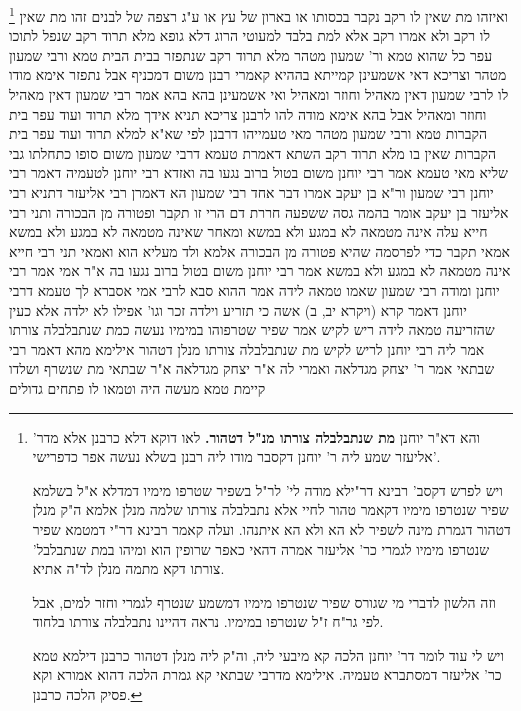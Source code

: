 \documentclass[12pt, openany]{book}
\newcommand{\footnotecomment}[1]{
	\renewcommand\thefootnote{}
	\footnote{#1}}
\newcommand{\commenta}[1]{\footnotecomment{#1}}
\begin{document}
{\commenta{ והא דא"ר יוחנן \textbf{מת שנתבלבלה צורתו מנ"ל דטהור.} לאו דוקא דלא כרבנן אלא מדר' אליעזר שמע ליה ר' יוחנן דקסבר מודו ליה רבנן בשלא נעשה אפר כדפרישי'.\par ויש לפרש דקסב' רבינא דר"ילא מודה לי' לר"ל בשפיר שטרפו מימיו דמדלא א"ל בשלמא שפיר שנטרפו מימיו דקאמר טהור לחיי אלא נתבלבלה צורתו שלמה מנלן אלמא ה"ק מנלן דטהור דגמרת מינה לשפיר לא הא ולא הא איתנהו. ועלה קאמר רבינא דר"י דמטמא שפיר שנטרפו מימיו לגמרי כר' אליעזר אמרה דהאי כאפר שרופין הוא ומיהו במת שנתבלבל' צורתו דקא מתמה מנלן לד"ה אתיא.\par וזה הלשון לדברי מי שגורס שפיר שנטרפו מימיו דמשמע שנטרף לגמרי וחזר למים, אבל לפי גר"ח ז"ל שנטרפו במימיו. נראה דהיינו נתבלבלה צורתו בלחוד.\par ויש לי עוד לומר דר' יוחנן הלכה קא מיבעי ליה, וה"ק ליה מנלן דטהור כרבנן דילמא טמא כר' אליעזר דמסתברא טעמיה. אילימא מדרבי שבתאי קא גמרת הלכה דהוא אמורא וקא פסיק הלכה כרבנן. }
ואיזהו מת שאין לו רקב נקבר בכסותו או בארון של עץ או ע"ג רצפה של לבנים זהו מת שאין לו רקב ולא אמרו רקב אלא למת בלבד למעוטי הרוג דלא 
גופא מלא תרוד רקב שנפל לתוכו עפר כל שהוא טמא ור' שמעון מטהר מלא תרוד רקב שנתפזר בבית הבית טמא ורבי שמעון מטהר 
וצריכא דאי אשמעינן קמייתא בההיא קאמרי רבנן משום דמכניף אבל נתפזר אימא מודו לו לרבי שמעון דאין מאהיל וחוזר ומאהיל 
ואי אשמעינן בהא בהא אמר רבי שמעון דאין מאהיל וחוזר ומאהיל אבל בהא אימא מודה להו לרבנן צריכא 
תניא אידך מלא תרוד ועוד עפר בית הקברות טמא ורבי שמעון מטהר מאי טעמייהו דרבנן לפי שא"א למלא תרוד ועוד עפר בית הקברות שאין בו מלא תרוד רקב 
השתא דאמרת טעמא דרבי שמעון משום סופו כתחלתו גבי שליא מאי טעמא אמר רבי יוחנן משום בטול ברוב נגעו בה 
ואזדא רבי יוחנן לטעמיה דאמר רבי יוחנן רבי שמעון ור"א בן יעקב אמרו דבר אחד רבי שמעון הא דאמרן רבי אליעזר דתניא רבי אליעזר בן יעקב אומר בהמה גסה ששפעה חררת דם הרי זו תקבר ופטורה מן הבכורה 
ותני רבי חייא עלה אינה מטמאה לא במגע ולא במשא ומאחר שאינה מטמאה לא במגע ולא במשא אמאי תקבר כדי לפרסמה שהיא פטורה מן הבכורה 
אלמא ולד מעליא הוא ואמאי תני רבי חייא אינה מטמאה לא במגע ולא במשא אמר רבי יוחנן משום בטול ברוב נגעו בה 
א"ר אמי אמר רבי יוחנן ומודה רבי שמעון שאמו טמאה לידה 
אמר ההוא סבא לרבי אמי אסברא לך טעמא דרבי יוחנן דאמר קרא (ויקרא יב, ב) אשה כי תזריע וילדה זכר וגו' אפילו לא ילדה אלא כעין שהזריעה טמאה לידה 
ריש לקיש אמר שפיר שטרפוהו במימיו נעשה כמת שנתבלבלה צורתו 
אמר ליה רבי יוחנן לריש לקיש מת שנתבלבלה צורתו מנלן דטהור אילימא מהא דאמר רבי שבתאי אמר ר' יצחק מגדלאה ואמרי לה א"ר יצחק מגדלאה א"ר שבתאי מת שנשרף ושלדו קיימת טמא מעשה היה וטמאו לו פתחים גדולים}
\end{document}
